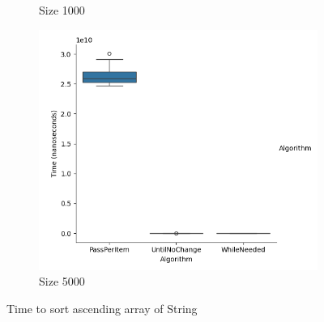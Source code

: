 \documentclass{article}
\begin{document}
\begin{figure}[ht]
\begin{subfigure}{0.3\textwidth}
    \caption{Size 1000}
    \label{fig:img2}
  \end{subfigure}
  \begin{subfigure}{0.3\textwidth}
    \centering
    \includegraphics[width=\linewidth]{../figureStringAsc5000.png}
    \caption{Size 5000}
    \label{fig:img3}
  \end{subfigure}
  \caption{Time to sort ascending array of String}
  \label{fig:three_images}
\end{figure}
\end{document}
